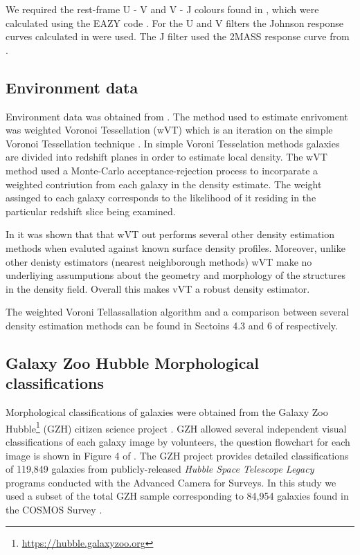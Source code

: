 \documentclass[a4paper,fleqn,usenatbib]{mnras}
\begin{document}
   We required the rest-frame U - V and V - J colours found in \cite{muzzin2013public}, which
   were calculated using the \textsc{EAZY} code \citep{eazycode}. For the U and V filters
   the Johnson response curves calculated in \cite{maiz2006} were used. The J filter used the 
   2MASS response curve from \cite{2mass2006}.

   

   \subsection{Environment data}
  
   Environment data was obtained from \cite{darvish2015}. The method used to estimate enrivoment was weighted
   Voronoi Tessellation (wVT) which is an iteration on the simple Voronoi Tessellation technique \citep{ebeling1993,bernardeau1996}.
   In simple Voroni Tesselation methods galaxies are divided into redshift planes in order to estimate local density.
   The wVT method used a Monte-Carlo acceptance-rejection process to incorparate a weighted contriution from each galaxy
   in the density estimate. The weight assinged to each galaxy corresponds to the likelihood of it residing in the 
   particular redshift slice being examined.

   In \cite{darvish2015} it was shown that that wVT out performs several other density estimation methods when evaluted 
   against known surface density profiles. Moreover, unlike other denisty estimators (nearest neighborough methods) 
   wVT make no underliying assumputions about the geometry and morphology of the structures in the density field. Overall
   this makes vVT a robust density estimator. 

   The weighted Voroni Tellassallation algorithm and a comparison between several density estimation methods can be found 
   in Sectoins 4.3 and 6 of \cite{darvish2015} respectively. 

   \subsection{Galaxy Zoo Hubble Morphological classifications}
   
   Morphological classifications of galaxies were obtained from the Galaxy Zoo Hubble\footnote{\url{https://hubble.galaxyzoo.org}} (GZH) citizen 
   science project \citep{galaxyzooHubble}. GZH allowed several independent visual classifications of each galaxy image by volunteers, the question flowchart for each
   image is shown in Figure 4 of \cite{galaxyzooHubble}. The GZH project provides detailed classifications of 119,849 galaxies from publicly-released \textit{Hubble
   Space Telescope Legacy} programs conducted with the Advanced Camera for Surveys. In this study we used a subset of the total GZH sample corresponding to 84,954
   galaxies found in the COSMOS Survey \citep{scoville2007,koekemoer2007}.
\end{document}
